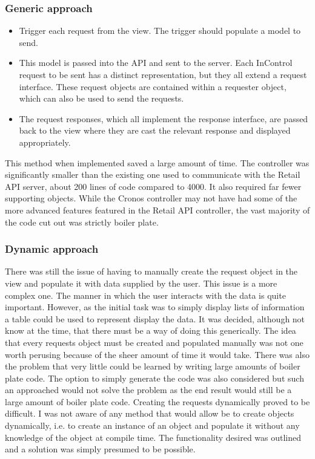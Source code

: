 \documentclass[a4paper, 11pt, titlepage]{article}
\begin{document}
\subsubsection{Generic approach} 
\begin{itemize} 
\item Trigger each request from the view. The trigger should populate a model to send. \label{cronos_generic_api} 
\item This model is passed into the API and sent to the server. Each InControl request to be sent has a distinct representation, but they all extend a request interface. These request objects are contained within a requester object, which can also be used to send the requests. 
\item The request responses, which all implement the response interface, are passed back to the view where they are cast the relevant response and displayed appropriately. 
\end{itemize} 
This method when implemented saved a large amount of time. The controller was significantly smaller than the existing one used to communicate with the Retail API server, about 200 lines of code compared to 4000. It also required far fewer supporting objects. While the Cronos controller may not have had some of the more advanced features featured in the Retail API controller, the vast majority of the code cut out was strictly boiler plate. 
\subsubsection{Dynamic approach} 
There was still the issue of having to manually create the request object in the view and populate it with data supplied by the user. This issue is a more complex one. The manner in which the user interacts with the data is quite important. However, as the initial task was to simply display lists of information a table could be used to represent display the data. It was decided, although not know at the time, that there must be a way of doing this generically. The idea that every requests object must be created and populated manually was not one worth perusing because of the sheer amount of time it would take. There was also the problem that very little could be learned by writing large amounts of boiler plate code. The option to simply generate the code was also considered but such an approached would not solve the problem as the end result would still be a large amount of boiler plate code. Creating the requests dynamically proved to be difficult. I was not aware of any method that would allow be to create objects dynamically, i.e. to create an instance of an object and populate it without any knowledge of the object at compile time. The functionality desired was outlined and a solution was simply presumed to be possible.  
\end{document}
